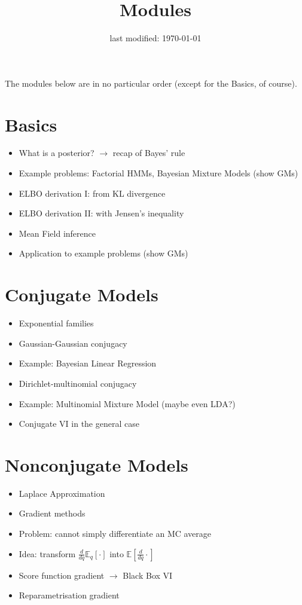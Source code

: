\documentclass[11pt, a4paper]{article}
\title{Modules}
\date{last modified: \today}
\author{}
\begin{document}
\maketitle

The modules below are in no particular order (except for the Basics, of course).
 
\section{Basics}

\begin{itemize}
\item What is a posterior? $ \rightarrow $ recap of Bayes' rule
\item Example problems: Factorial HMMs, Bayesian Mixture Models (show GMs)
\item ELBO derivation I: from KL divergence
\item ELBO derivation II: with Jensen's inequality
\item Mean Field inference
\item Application to example problems (show GMs)
\end{itemize}

\section{Conjugate Models}
\begin{itemize}
\item Exponential families
\item Gaussian-Gaussian conjugacy
\item Example: Bayesian Linear Regression
\item Dirichlet-multinomial conjugacy
\item Example: Multinomial Mixture Model (maybe even LDA?)
\item Conjugate VI in the general case \citep{Beal:2003}
\end{itemize}

\section{Nonconjugate Models}
\begin{itemize}
\item Laplace Approximation
\item Gradient methods
\item Problem: cannot simply differentiate an MC average
\item Idea: transform $ \frac{d}{dq} \mathbb{E}_{q}[\cdot] $ into $ \mathbb{E}[\frac{d}{dq}\cdot] $
\item Score function gradient $ \rightarrow $ Black Box VI \citep{PaisleyEtAl:2012, RanganathEtAl:2014}
\item Reparametrisation gradient \citep{KingmaWelling:2013, RezendeEtAl:2014, TitsiasLazarogredilla:2014}
\end{itemize}
\end{document}
